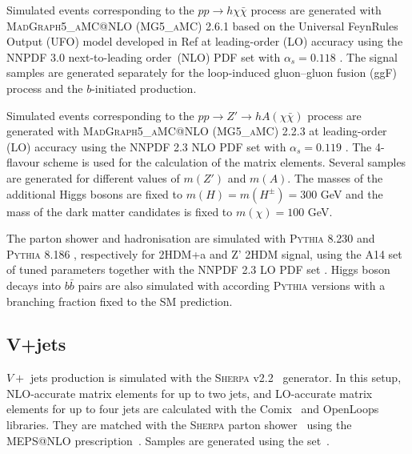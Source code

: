 \par Simulated events corresponding to the $pp\to h\chi\bar{\chi}$ process are generated with \textsc{MadGraph5\_aMC@NLO} (\textsc{MG5\_aMC}) 2.6.1 \cite{Alwall:2014hca} 
based on the Universal FeynRules Output (UFO) model developed in Ref\cite{Abe:2018bpo} at leading-order (LO) accuracy using the NNPDF 3.0 next-to-leading order~(NLO) PDF set with $\alpha_s=0.118$ \cite{Ball:2014uwa}. 
The signal samples are generated separately for the loop-induced gluon--gluon fusion (ggF) process and the $b$-initiated production. 

\par Simulated events corresponding to the $pp\to Z'\to h A(\chi\bar{\chi})$ process are generated with \textsc{MadGraph5\_aMC@NLO} (\textsc{MG5\_aMC}) 2.2.3 \cite{Alwall:2014hca} 
at leading-order (LO) accuracy using the NNPDF 2.3 NLO PDF set with $\alpha_s=0.119$ \cite{Ball:2012cx}. 
The 4-flavour scheme is used for the calculation of the matrix elements. Several samples are generated for different values of $m(Z')$ and $m(A)$.
The masses of the additional Higgs bosons are fixed to $m(H)=m(H^{\pm})=300$ GeV and the mass of the dark matter candidates is fixed to $m(\chi)=100$ GeV. 

\par The parton shower and hadronisation are simulated with \textsc{Pythia} 8.230 \cite{Sjostrand:2014zea} and \textsc{Pythia} 8.186 \cite{Sjostrand:2007gs}, respectively for 2HDM+a and Z' 2HDM signal,
using the A14 set \cite{ATL-PHYS-PUB-2014-021} of tuned parameters together with the NNPDF 2.3 LO PDF set \cite{Ball:2011mu}. 
Higgs boson decays into $b\bar{b}$ pairs are also simulated with according \textsc{Pythia} versions with a branching fraction fixed to the SM prediction.

\subsection{V+jets}

\par $V+$ jets production is simulated with the \textsc{Sherpa} v2.2~\cite{Bothmann:2019yzt} generator. 
In this setup, NLO-accurate matrix elements for up to two jets, and LO-accurate matrix elements for up to four jets are calculated with the Comix~\cite{Gleisberg:2008fv} and OpenLoops~\cite{Cascioli:2011va,Denner:2016kdg} libraries. 
They are matched with the \textsc{Sherpa} parton shower~\cite{Schumann:2007mg} using the MEPS@NLO prescription~\cite{Hoeche:2011fd,Hoeche:2012yf,Catani:2001cc,Hoeche:2009rj}.
Samples are generated using the \nnpdfnnlo set~\cite{Ball:2014uwa}.

